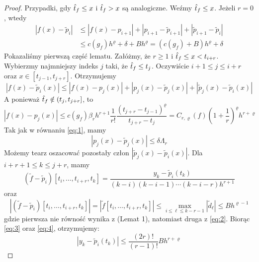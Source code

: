 \documentclass[oik, pdftex, robocza, man]{mgrwms}
\begin{document}
    \begin{proof}
        Przypadki, gdy $\hat{t}_{f} \leq x$ i $\hat{t}_{f} > x$ są analogiczne. Weźmy $\hat{t}_{f} \leq x$. Jeżeli $r=0$, wtedy
        \begin{equation*}
            \begin{aligned}
                \left|f(x)-\tilde{p}_{i}\right| & \leq\left|f(x)-p_{i+1}\right|+\left|p_{i+1}-\tilde{p}_{i+1}\right|+\left|\tilde{p}_{i+1}-\tilde{p}_{i}\right| \\
                & \leq c\left(g_{f}\right) h^{\varrho}+\delta+B h^{\varrho}=\left(c\left(g_{f}\right)+B\right) h^{\varrho}+\delta
            \end{aligned}    
        \end{equation*}
        Pokazaliśmy pierwszą część lematu.
        Załóżmy, że $r \geq 1$ i $\hat{t}_{f} \leq x<t_{i+r}$. Wybierzmy najmniejszy indeks $j$ taki, że $\hat{t}_{f} \leq t_{j}$. Oczywiście $i+1 \leq j \leq i+r$ oraz $x \in\left[t_{j-1}, t_{j+r}\right]$. 
        Otrzymujemy
        \begin{equation} \label{eq:6}
            \left|f(x)-\tilde{p}_{i}(x)\right| \leq\left|f(x)-p_{j}(x)\right|+\left|p_{j}(x)-\tilde{p}_{j}(x)\right|+\left|\tilde{p}_{j}(x)-\tilde{p}_{i}(x)\right|
        \end{equation}
        A ponieważ $\hat{t}_{f} \notin\left(t_{j}, t_{j+r}\right]$, to
        \begin{equation*}
            \left|f(x)-p_{j}(x)\right| \leq c\left(g_{f}\right) \beta_{r} h^{r+1} \frac{1}{r !} \frac{\left(t_{j+r}-t_{j-1}\right)^{\varrho}}{t_{j+r}-t_{j}}=C_{r, \varrho}(f)\left(1+\frac{1}{r}\right)^{\varrho} h^{r+\varrho}
        \end{equation*}
        Tak jak w równaniu \eqref{eq:1}, mamy
        \begin{equation*}
            \left|p_{j}(x)-\tilde{p}_{j}(x)\right| \leq \delta \Lambda_{r}            
        \end{equation*}
        Możemy tearz oszacować pozostały człon $\left|\tilde{p}_{j}(x)-\tilde{p}_{i}(x)\right|$. Dla $i+r+1 \leq k \leq j+r$, mamy
        \begin{equation} \label{eq:3}
            \left(\tilde{f}-\tilde{p}_{i}\right)\left[t_{i}, \ldots, t_{i+r}, t_{k}\right]=\frac{y_{k}-\tilde{p}_{i}\left(t_{k}\right)}{(k-i)(k-i-1) \cdots(k-i-r) h^{r+1}}
        \end{equation}
        oraz
        \begin{equation} \label{eq:4}
            \left|\left(\tilde{f}-\tilde{p}_{i}\right)\left[t_{i}, \ldots, t_{i+r}, t_{k}\right]\right|=\left|\tilde{f}\left[t_{i}, \ldots, t_{i+r}, t_{k}\right]\right| \leq \max _{i \leq \ell \leq k-r-1}\left|\tilde{d}_{\ell}\right| \leq B h^{\varrho-1}            
        \end{equation}
        gdzie pierwsza nie równość wynika z \cite{UA}(Lemat 1), natomiast druga z \eqref{eq:2}. Biorąc \eqref{eq:3} oraz \eqref{eq:4}, otrzymujemy:
        \begin{equation} \label{eq:5}
            \left|y_{k}-\tilde{p}_{i}\left(t_{k}\right)\right| \leq \frac{(2 r) !}{(r-1) !} B h^{r+\varrho}
        \end{equation}


\end{proof}
\end{document}
